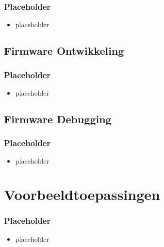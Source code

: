 \documentclass{beamer}
\begin{document}
\begin{frame} 
\frametitle{Placeholder}
  \begin{itemize}[<+->]
    \item placeholder
  \end{itemize}
\end{frame}

\subsection{Firmware Ontwikkeling}

\begin{frame} 
\frametitle{Placeholder}
  \begin{itemize}[<+->]
    \item placeholder
  \end{itemize}
\end{frame}

\subsection{Firmware Debugging}

\begin{frame} 
\frametitle{Placeholder}
  \begin{itemize}[<+->]
    \item placeholder
  \end{itemize}
\end{frame}

\section{Voorbeeldtoepassingen}

\begin{frame} 
\frametitle{Placeholder}
  \begin{itemize}[<+->]
    \item placeholder
  \end{itemize}
\end{frame}

\end{document}
